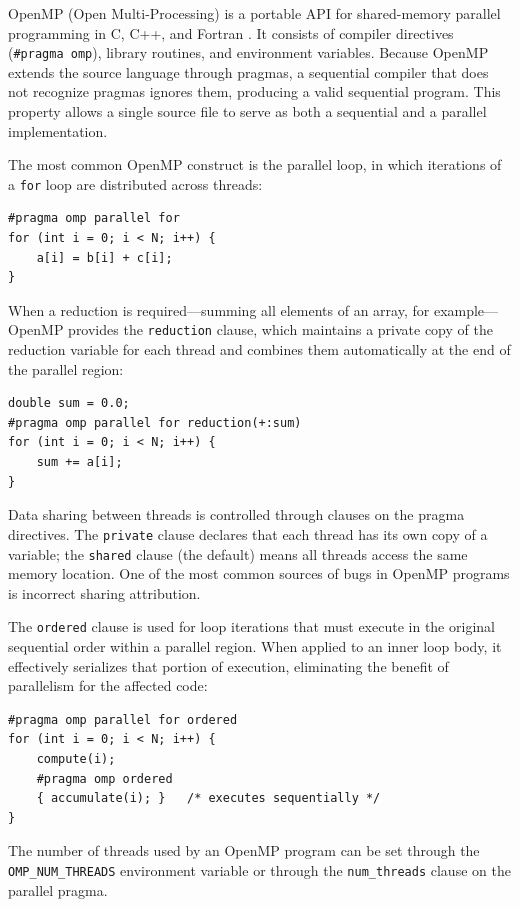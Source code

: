 OpenMP (Open Multi-Processing) is a portable API for shared-memory parallel programming in C, C++, and Fortran . 
It consists of compiler directives (\texttt{\#pragma omp}), library routines, and environment variables. 
Because OpenMP extends the source language through pragmas, a sequential compiler that does not recognize pragmas ignores them, producing a valid sequential program. 
This property allows a single source file to serve as both a sequential and a parallel implementation.

The most common OpenMP construct is the parallel loop, in which iterations of a \texttt{for} loop are distributed across threads:

\begin{verbatim}
#pragma omp parallel for
for (int i = 0; i < N; i++) {
    a[i] = b[i] + c[i];
}
\end{verbatim}

When a reduction is required—summing all elements of an array, for example—OpenMP provides the \texttt{reduction} clause, which maintains a private copy of the reduction variable for each thread and combines them automatically at the end of the parallel region:

\begin{verbatim}
double sum = 0.0;
#pragma omp parallel for reduction(+:sum)
for (int i = 0; i < N; i++) {
    sum += a[i];
}
\end{verbatim}

Data sharing between threads is controlled through clauses on the pragma directives. The \texttt{private} clause declares that each thread has its own copy of a variable; the \texttt{shared} clause (the default) means all threads access the same memory location. 
One of the most common sources of bugs in OpenMP programs is incorrect sharing attribution.

The \texttt{ordered} clause is used for loop iterations that must execute in the original sequential order within a parallel region. When applied to an inner loop body, it effectively serializes that portion of execution, eliminating the benefit of parallelism for the affected code:

\begin{verbatim}
#pragma omp parallel for ordered
for (int i = 0; i < N; i++) {
    compute(i);
    #pragma omp ordered
    { accumulate(i); }   /* executes sequentially */
}
\end{verbatim}

The number of threads used by an OpenMP program can be set through the \texttt{OMP\_NUM\_THREADS} environment variable or through the \texttt{num\_threads} clause on the parallel pragma.

